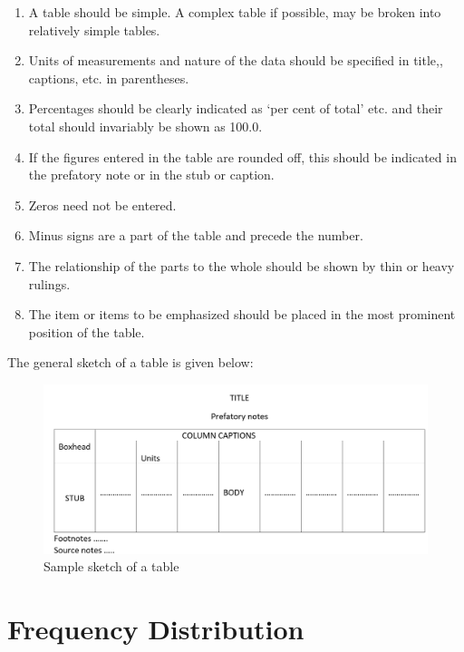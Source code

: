 \documentclass[]{article}
\begin{document}
\begin{enumerate}
\def\labelenumi{(\roman{enumi})}
\item
  A table should be simple. A complex table if possible, may be broken
  into relatively simple tables.
\item
  Units of measurements and nature of the data should be specified in
  title,, captions, etc. in parentheses.
\item
  Percentages should be clearly indicated as `per cent of total' etc.
  and their total should invariably be shown as 100.0.
\item
  If the figures entered in the table are rounded off, this should be
  indicated in the prefatory note or in the stub or caption.
\item
  Zeros need not be entered.
\item
  Minus signs are a part of the table and precede the number.
\item
  The relationship of the parts to the whole should be shown by thin or
  heavy rulings.
\item
  The item or items to be emphasized should be placed in the most
  prominent position of the table.
\end{enumerate}

The general sketch of a table is given below:

\begin{figure}
\centering
\includegraphics{../fig/tablesketch.png}
\caption{Sample sketch of a table}
\end{figure}

\hypertarget{frequency-distribution}{%
\section{Frequency Distribution}\label{frequency-distribution}}
\end{document}
